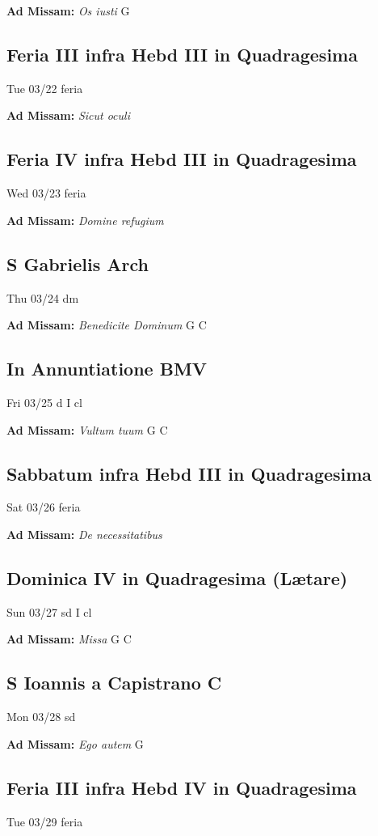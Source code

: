 \documentclass[letterpaper, 10pt, twocolumn]{article}
\begin{document}
\textbf{Ad Missam:} \textit{Os iusti} G 

\subsection*{Feria III infra Hebd III in Quadragesima}Tue 03/22 feria

\textbf{Ad Missam:} \textit{Sicut oculi} 

\subsection*{Feria IV infra Hebd III in Quadragesima}Wed 03/23 feria

\textbf{Ad Missam:} \textit{Domine refugium} 

\subsection*{S Gabrielis Arch}Thu 03/24 dm

\textbf{Ad Missam:} \textit{Benedicite Dominum} G C 

\subsection*{In Annuntiatione BMV}Fri 03/25 d I cl

\textbf{Ad Missam:} \textit{Vultum tuum} G C 

\subsection*{Sabbatum infra Hebd III in Quadragesima}Sat 03/26 feria

\textbf{Ad Missam:} \textit{De necessitatibus} 

\subsection*{Dominica IV in Quadragesima (Lætare)}Sun 03/27 sd I cl

\textbf{Ad Missam:} \textit{Missa} G C 

\subsection*{S Ioannis a Capistrano C}Mon 03/28 sd

\textbf{Ad Missam:} \textit{Ego autem} G 

\subsection*{Feria III infra Hebd IV in Quadragesima }Tue 03/29 feria
\end{document}
